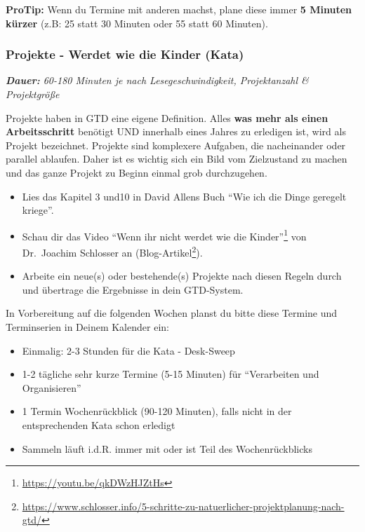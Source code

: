 \documentclass[
  ngerman,
  paper=a4,
,captions=tableheading
]{scrartcl}
\DeclareRobustCommand{\href}[2]{#2\footnote{\url{#1}}}
\providecommand{\tightlist}{%
  \setlength{\itemsep}{0pt}\setlength{\parskip}{0pt}}
\begin{document}
\textbf{ProTip:} Wenn du Termine mit anderen machst, plane diese immer
\textbf{5 Minuten kürzer} (z.B: 25 statt 30 Minuten oder 55 statt 60
Minuten).

\hypertarget{projekte---werdet-wie-die-kinder-kata}{%
\subsubsection{Projekte - Werdet wie die Kinder
(Kata)}\label{projekte---werdet-wie-die-kinder-kata}}

\emph{\textbf{Dauer:} 60-180 Minuten je nach Lesegeschwindigkeit,
Projektanzahl \& Projektgröße}

Projekte haben in GTD eine eigene Definition. Alles \textbf{was mehr als
einen Arbeitsschritt} benötigt UND innerhalb eines Jahres zu erledigen
ist, wird als Projekt bezeichnet. Projekte sind komplexere Aufgaben, die
nacheinander oder parallel ablaufen. Daher ist es wichtig sich ein Bild
vom Zielzustand zu machen und das ganze Projekt zu Beginn einmal grob
durchzugehen.

\begin{itemize}
\item
  Lies das Kapitel 3 und10 in David Allens Buch ``Wie ich die Dinge
  geregelt kriege''.
\item
  Schau dir das Video \href{https://youtu.be/qkDWzHJZtHs}{``Wenn ihr
  nicht werdet wie die Kinder''} von Dr.~Joachim Schlosser an
  (\href{https://www.schlosser.info/5-schritte-zu-natuerlicher-projektplanung-nach-gtd/}{Blog-Artikel}).
\item
  Arbeite ein neue(s) oder bestehende(s) Projekte nach diesen Regeln
  durch und übertrage die Ergebnisse in dein GTD-System.
\end{itemize}

In Vorbereitung auf die folgenden Wochen planst du bitte diese Termine
und Terminserien in Deinem Kalender ein:

\begin{itemize}
\tightlist
\item
  Einmalig: 2-3 Stunden für die Kata - Desk-Sweep
\item
  1-2 tägliche sehr kurze Termine (5-15 Minuten) für ``Verarbeiten und
  Organisieren''
\item
  1 Termin Wochenrückblick (90-120 Minuten), falls nicht in der
  entsprechenden Kata schon erledigt
\item
  Sammeln läuft i.d.R. immer mit oder ist Teil des Wochenrückblicks
\end{itemize}
\end{document}
